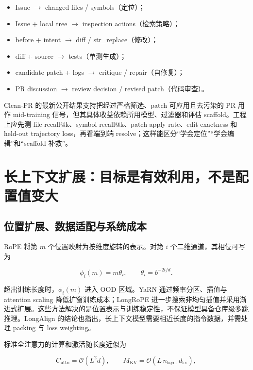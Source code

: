 \documentclass[10pt,a4paper,UTF8,fontset=none]{ctexart}
\newcommand{\metric}[1]{\textcolor{GoodGreen}{#1}}
\newcommand{\ident}[1]{{\rmfamily #1}}
\begin{document}
\begin{itemize}
  \item Issue $\rightarrow$ changed files / symbols（定位）；
  \item Issue + local tree $\rightarrow$ inspection actions（检索策略）；
  \item before + intent $\rightarrow$ diff / \ident{str\_replace}（修改）；
  \item diff + source $\rightarrow$ tests（单测生成）；
  \item candidate patch + logs $\rightarrow$ critique / repair（自修复）；
  \item PR discussion $\rightarrow$ review decision / revised patch（代码审查）。
\end{itemize}

Clean-PR 的最新公开结果支持把经过严格筛选、patch 可应用且去污染的 PR 用作 mid-training 信号，但其具体收益依赖所用模型、过滤器和评估 scaffold\cite{lo2026cleanpr}。工程上应先测 \metric{file recall@k}、\metric{symbol recall@k}、patch apply rate、edit exactness 和 held-out trajectory loss，再看端到端 resolve；这样能区分“学会定位”“学会编辑”和“scaffold 补救”。

\section{长上下文扩展：目标是有效利用，不是配置值变大}

\subsection{位置扩展、数据适配与系统成本}

RoPE 将第 $m$ 个位置映射为按维度旋转的表示。对第 $i$ 个二维通道，其相位可写为

\begin{equation}
\phi_i(m)=m\theta_i,\qquad \theta_i=b^{-2i/d}.
\label{eq:rope}
\end{equation}

超出训练长度时，$\phi_i(m)$ 进入 OOD 区域。YaRN 通过频率分区、插值与 attention scaling 降低扩窗训练成本\cite{peng2023yarn}；LongRoPE 进一步搜索非均匀插值并采用渐进式扩展\cite{ding2024longrope}。这些方法解决的是位置表示与训练稳定性，不保证模型具备仓库级多跳推理。LongAlign 的结论也指出，长上下文模型需要相近长度的指令数据，并需处理 packing 与 loss weighting\cite{bai2024longalign}。

标准全注意力的计算和激活随长度近似为

\begin{equation}
C_{\mathrm{attn}}=\mathcal{O}(L^2 d),\qquad M_{\mathrm{KV}}=\mathcal{O}(L\,n_{\mathrm{layer}}\,d_{\mathrm{kv}}),
\label{eq:long-cost}
\end{equation}
\end{document}

